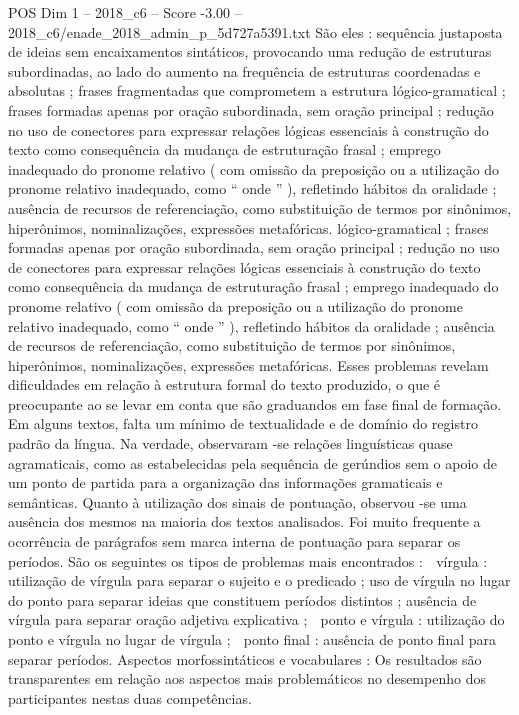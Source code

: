 \begin{textsample}{POS Dim 1 – 2018\_c6 – Score -3.00 – 2018\_c6/enade\_2018\_admin\_p\_5d727a5391.txt}
São eles : sequência justaposta de ideias sem encaixamentos sintáticos, provocando uma redução de estruturas subordinadas, ao lado do aumento na frequência de estruturas coordenadas e absolutas ; frases fragmentadas que comprometem a estrutura lógico-gramatical ; frases formadas apenas por oração subordinada, sem oração principal ; redução no uso de conectores para expressar relações lógicas essenciais à construção do texto como consequência da mudança de estruturação frasal ; emprego inadequado do pronome relativo ( com omissão da preposição ou a utilização do pronome relativo inadequado, como “ onde ” ), refletindo hábitos da oralidade ; ausência de recursos de referenciação, como substituição de termos por sinônimos, hiperônimos, nominalizações, expressões metafóricas. lógico-gramatical ; frases formadas apenas por oração subordinada, sem oração principal ; redução no uso de conectores para expressar relações lógicas essenciais à construção do texto como consequência da mudança de estruturação frasal ; emprego inadequado do pronome relativo ( com omissão da preposição ou a utilização do pronome relativo inadequado, como “ onde ” ), refletindo hábitos da oralidade ; ausência de recursos de referenciação, como substituição de termos por sinônimos, hiperônimos, nominalizações, expressões metafóricas.
Esses problemas revelam dificuldades em relação à estrutura formal do texto produzido, o que é preocupante ao se levar em conta que são graduandos em fase final de formação.
Em alguns textos, falta um mínimo de textualidade e de domínio do registro padrão da língua.
Na verdade, observaram -se relações linguísticas quase agramaticais, como as estabelecidas pela sequência de gerúndios sem o apoio de um ponto de partida para a organização das informações gramaticais e semânticas.
Quanto à utilização dos sinais de pontuação, observou -se uma ausência dos mesmos na maioria dos textos analisados.
Foi muito frequente a ocorrência de parágrafos sem marca interna de pontuação para separar os períodos.
São os seguintes os tipos de problemas mais encontrados :  vírgula : utilização de vírgula para separar o sujeito e o predicado ; uso de vírgula no lugar do ponto para separar ideias que constituem períodos distintos ; ausência de vírgula para separar oração adjetiva explicativa ;  ponto e vírgula : utilização do ponto e vírgula no lugar de vírgula ;  ponto final : ausência de ponto final para separar períodos.
Aspectos morfossintáticos e vocabulares : Os resultados são transparentes em relação aos aspectos mais problemáticos no desempenho dos participantes nestas duas competências.

\end{textsample}
